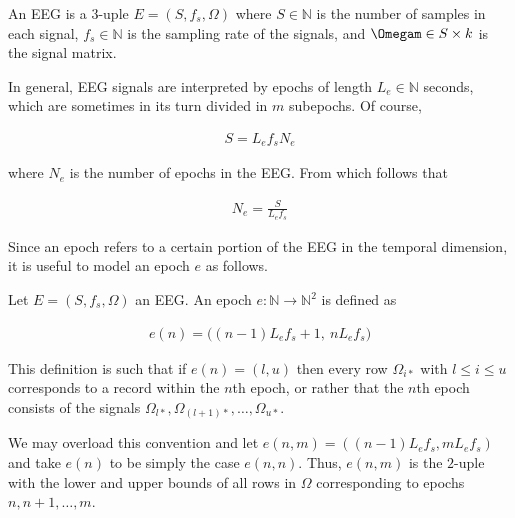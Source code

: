 \documentclass[a4paper, 12pt]{article}
\begin{document}
    
\begin{definition}
    An EEG is a $3$-uple $E = (S, f_s, \Omega)$ where $S \in \mathbb{N}$ is the
    number of samples in each signal, $f_s \in \mathbb{N}$ is the sampling rate
    of the signals, and $\Omegam \in S \times k$ is the signal matrix.
\end{definition}

In general, EEG signals are interpreted by epochs of length $L_e \in \mathbb{N}$
seconds, which are sometimes in its turn divided in $m$ subepochs.
Of course,

\begin{align*}
    S = L_e f_s N_e
\end{align*}

where $N_e$ is the number of epochs in the EEG. From which follows that 

\begin{align*}
    N_e = \frac{S}{L_e f_s}
\end{align*}

Since an epoch refers to a certain portion of the EEG in the temporal
dimension, it is useful to model an epoch $e$ as follows.

\begin{definition}
    Let $E = (S, f_s, \Omega)$ an EEG. An epoch $e : \mathbb{N} \to \mathbb{N}^2$ is defined as 

    \begin{align*}
        e(n) =  \Big( (n-1) L_e f_s + 1, ~ n L_e f_s \Big) 
    \end{align*}
\end{definition}

This definition is such that if $e(n) = (l, u)$ then every row $\Omega_{i *}$
with $l \leq i \leq u$ corresponds to a record within the $n$th epoch, or
rather that the $n$th epoch consists of the signals $\Omega_{l*},
\Omega_{(l+1)*}, \ldots, \Omega_{u*} $.

We may overload this convention and let $e(n, m) = \left( \left(n-1 \right)L_e
f_s, mL_e f_s  \right) $ and take $e(n)$ to be simply the case $e(n, n)$. Thus,
$e(n, m)$ is the $2$-uple with the lower and upper bounds of all rows in
$\Omega$ corresponding to epochs $n, n+1, \ldots, m$.
\end{document}
